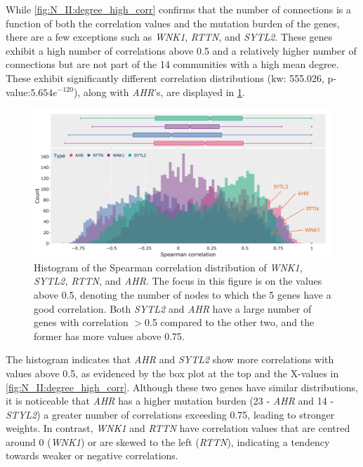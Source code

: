 While \cref{fig:N_II:degree_high_corr} confirms that the number of connections is a function of both the correlation values and the mutation burden of the genes, there are a few exceptions such as \textit{WNK1}, \textit{RTTN}, and \textit{SYTL2}. These genes exhibit a high number of correlations above 0.5 and a relatively higher number of connections but are not part of the 14 communities with a high mean degree. These exhibit significantly different correlation distributions (\acrshort{kw}: 555.026, p-value:$5.654e^{-120}$), along with \textit{AHR}'s, are displayed in \cref{fig:N_II:corr_sel_genes}. 


\begin{figure}[!b]    
    \centering
    \includegraphics[width=1.0\textwidth,height=1.0\textheight,keepaspectratio]{Sections/Network_II/resources/reward/hist_corr_labels.png}
    \caption[Distribution of Spearman for a few genes]{Histogram of the Spearman correlation distribution of \textit{WNK1, SYTL2, RTTN}, and \textit{AHR}. The focus in this figure is on the values above 0.5, denoting the number of nodes to which the 5 genes have a good correlation. Both \textit{SYTL2} and \textit{AHR} have a large number of genes with correlation $>$0.5 compared to the other two, and the former has more values above 0.75. }
    \label{fig:N_II:corr_sel_genes}
\end{figure}


The histogram indicates that \textit{AHR} and \textit{SYTL2} show more correlations with values above 0.5, as evidenced by the box plot at the top and the X-values in \cref{fig:N_II:degree_high_corr}. Although these two genes have similar distributions, it is noticeable that \textit{AHR} has a higher mutation burden (23 - \textit{AHR} and 14 - \textit{STYL2}) a greater number of correlations exceeding 0.75, leading to stronger weights. In contrast, \textit{WNK1} and \textit{RTTN} have correlation values that are centred around 0 (\textit{WNK1}) or are skewed to the left (\textit{RTTN}), indicating a tendency towards weaker or negative correlations.

